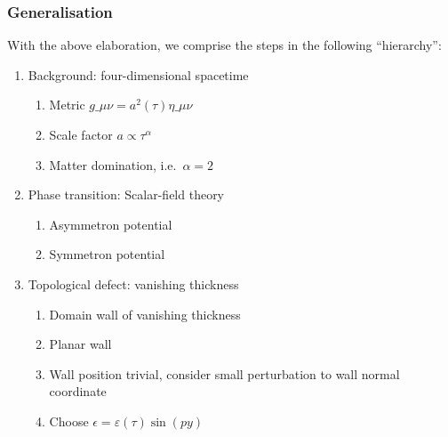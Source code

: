 
\subsubsection{Generalisation}
With the above elaboration, we comprise the steps in the following ``hierarchy'':
\begin{enumerate}
    \item\label{item:whatif:framework:bckg} Background: four-dimensional spacetime %
    \begin{enumerate}
        \item Metric $g\_{\mu\nu}= a^2(\tau)\eta\_{\mu\nu}$ 
        \item\label{item:whatif:framework:bckg_simple_scale_factor} Scale factor $a\propto \tau^\alpha$
        \item\label{item:whatif:framework:bckg_matter_dom} Matter domination, i.e.~$\alpha=2$
    \end{enumerate}
    \item\label{item:whatif:framework:pt}  Phase transition: Scalar-field theory %
        \begin{enumerate}
            \item\label{item:whatif:framework:pt_asymmetron} Asymmetron potential
            \item\label{item:whatif:framework:pt_symmetron}  Symmetron potential
        \end{enumerate}
    \item\label{item:whatif:framework:defect} Topological defect: vanishing thickness %
        \begin{enumerate}
            \item\label{item:whatif:framework:defect_dw} Domain wall of vanishing thickness 
            \item\label{item:whatif:framework:defect_planar} Planar wall
            \item\label{item:whatif:framework:defect_pert} Wall position trivial, consider small perturbation to wall normal coordinate
            \item\label{item:whatif:framework:defect_simple_pert} Choose $\epsilon=\varepsilon(\tau)\sin(py)$
        \end{enumerate}
\end{enumerate}


